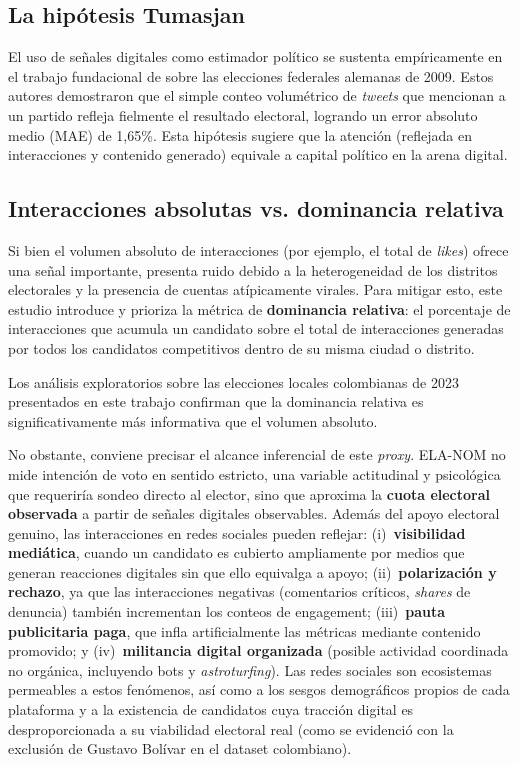 \subsection{La hipótesis Tumasjan}

El uso de señales digitales como estimador político se sustenta empíricamente en el trabajo fundacional de \textcite{tumasjan2010} sobre las elecciones federales alemanas de 2009. Estos autores demostraron que el simple conteo volumétrico de \textit{tweets} que mencionan a un partido refleja fielmente el resultado electoral, logrando un error absoluto medio (MAE) de 1{,}65\%. Esta hipótesis sugiere que la atención (reflejada en interacciones y contenido generado) equivale a capital político en la arena digital.

\subsection{Interacciones absolutas vs. dominancia relativa}

Si bien el volumen absoluto de interacciones (por ejemplo, el total de \textit{likes}) ofrece una señal importante, presenta ruido debido a la heterogeneidad de los distritos electorales y la presencia de cuentas atípicamente virales. Para mitigar esto, este estudio introduce y prioriza la métrica de \textbf{dominancia relativa}: el porcentaje de interacciones que acumula un candidato sobre el total de interacciones generadas por todos los candidatos competitivos dentro de su misma ciudad o distrito.

Los análisis exploratorios sobre las elecciones locales colombianas de 2023 presentados en este trabajo confirman que la dominancia relativa es significativamente más informativa que el volumen absoluto.

No obstante, conviene precisar el alcance inferencial de este \textit{proxy}. ELA-NOM no mide intención de voto en sentido estricto, una variable actitudinal y psicológica que requeriría sondeo directo al elector, sino que aproxima la \textbf{cuota electoral observada} a partir de señales digitales observables. Además del apoyo electoral genuino, las interacciones en redes sociales pueden reflejar: (i)~\textbf{visibilidad mediática}, cuando un candidato es cubierto ampliamente por medios que generan reacciones digitales sin que ello equivalga a apoyo; (ii)~\textbf{polarización y rechazo}, ya que las interacciones negativas (comentarios críticos, \textit{shares} de denuncia) también incrementan los conteos de engagement; (iii)~\textbf{pauta publicitaria paga}, que infla artificialmente las métricas mediante contenido promovido; y (iv)~\textbf{militancia digital organizada} (posible actividad coordinada no orgánica, incluyendo bots y \textit{astroturfing}). Las redes sociales son ecosistemas permeables a estos fenómenos, así como a los sesgos demográficos propios de cada plataforma y a la existencia de candidatos cuya tracción digital es desproporcionada a su viabilidad electoral real (como se evidenció con la exclusión de Gustavo Bolívar en el dataset colombiano).

